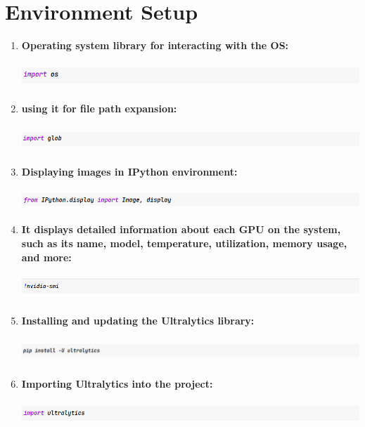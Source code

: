 \documentclass[12 pt]{report}
\begin{document}
\section{Environment Setup}
 {
  \begin{enumerate}
    \item \textbf{ Operating system library for interacting with the OS:}
          \begin{center}
            \includegraphics[width=17cm, height=1cm]{import Os.png}
          \end{center}

    \item \textbf{using it for file path expansion:}
          \begin{center}
            \includegraphics[width=17cm, height=1cm]{Import global.png}
          \end{center}

    \item \textbf{Displaying images in IPython environment:}
          \begin{center}
            \includegraphics[width=17cm, height=0.8cm]{Form Iphoton.display.png}
          \end{center}

    \item \textbf{ It displays detailed information about each GPU on the system, such as its name, model, temperature, utilization, memory usage, and more:}
          \begin{center}
            \includegraphics[width=17cm, height=1cm]{nvidia-smi.png}
          \end{center}

    \item \textbf{Installing and updating the Ultralytics library:}
          \begin{center}
            \includegraphics[width=17cm, height=1cm]{ipi install ultalatics.png}
          \end{center} 
\newpage
    \item \textbf{Importing Ultralytics into the project:}
          \begin{center}
            \includegraphics[width=17cm, height=1cm]{import ultralatics.png}
          \end{center}


\end{enumerate}}
\end{document}
